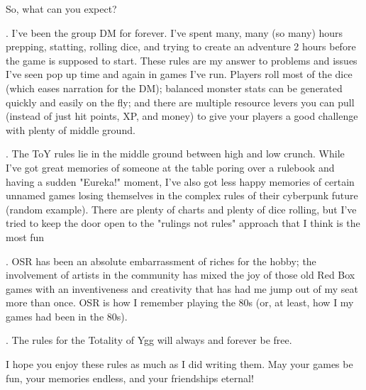 {    So, what can you expect?

    .   I've been the group DM for forever.  I've spent many, many (so many) hours prepping, statting, rolling dice, and trying to create an adventure 2 hours before the game is supposed to start.  These rules are my answer to problems and issues I've seen pop up time and again in games I've run.  Players roll most of the dice (which eases narration for the DM); balanced monster stats can be generated quickly and easily on the fly; and there are multiple resource levers you can pull (instead of just hit points, XP, and money) to give your players a good challenge with plenty of middle ground.

    .  The ToY rules lie in the middle ground between high and low crunch.  While I've got great memories of someone at the table poring over a rulebook and having a sudden "Eureka!" moment, I've also got less happy memories of certain unnamed games losing themselves in the complex rules of their cyberpunk future (random example).  There are plenty of charts and plenty of dice rolling, but I've tried to keep the door open to the "rulings not rules" approach that I think is the most fun

    . OSR has been an absolute embarrassment of riches for the hobby; the involvement of artists in the community has mixed the joy of those old Red Box games with an inventiveness and creativity that has had me jump out of my seat more than once.  OSR is how I remember playing the 80s (or, at least, how I  my games had been in the 80s).

    . The rules for the Totality of Ygg will always and forever be free.


    I hope you enjoy these rules as much as I did writing them.  May your games be fun, your memories endless, and your friendships eternal!

    \vspace*{\fill}
    \justifying

} %
